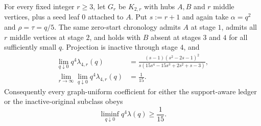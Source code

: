 \begin{corollary}
\label{cor:consumed-energy-bipartite-quartic-family}
For every fixed integer $r\geq3$, let $G_r$ be $K_{2,r}$ with hubs $A,B$ and
$r$ middle vertices, plus a seed leaf $0$ attached to $A$.  Put $s:=r+1$ and
again take $\alpha=q^2$ and $\rho=\tau=q/5$.  The same zero-start chronology
admits $A$ at stage $1$, admits all $r$ middle vertices at stage $2$, and
holds with $B$ absent at stages $3$ and $4$ for all sufficiently small $q$.
Projection is inactive through stage $4$, and
\begin{align}
 \lim_{q\downarrow0}q^4\lambda_{4,r}(q)
 &=
 \frac{(s-1)(s^2-2s-1)^2}
 {s(15s^4-15s^3+2s^2+s-3)},\label{eq:bipartite-quartic-constant}\\
 \lim_{r\to\infty}\lim_{q\downarrow0}q^4\lambda_{4,r}(q)
 &=\frac1{15}.\label{eq:bipartite-quartic-limit}
\end{align}
Consequently every graph-uniform coefficient for either the support-aware
ledger or the inactive-original subclass obeys
\begin{equation}
 \liminf_{q\downarrow0}q^4\lambda(q)\geq\frac1{15}.
 \label{eq:graph-uniform-quartic-liminf}
\end{equation}
\end{corollary}

